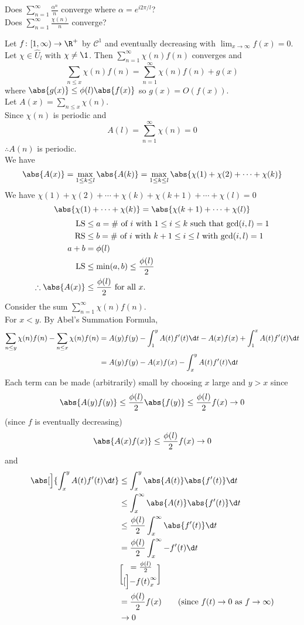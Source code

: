 \question Does $\sum_{n=1}^\infty\frac{\alpha^n}{n}$ converge where $\alpha=e^{i2\pi/l}$? \\
Does $\sum_{n=1}^\infty\frac{\chi(n)}{n}$ converge?

\thm Let $f\colon[1,\infty)\to\R^+$ by $\mathcal{C}^1$ and eventually decreasing with $\lim_{x\to\infty}f(x)=0$.  Let $\chi\in\hat U_l$ with $\chi\neq\1$.  Then $\sum_{n=1}^\infty\chi(n)f(n)$ converges and
\[ \sum_{n\leq x}\chi(n)f(n) = \sum_{n=1}^\infty \chi(n)f(n) + g(x) \]
where $\abs{g(x)}\leq\phi(l)\abs{f(x)}$ so $g(x)=O(f(x))$. \\
\pf Let $A(x)=\sum_{n\leq x}\chi(n)$. \\
Since $\chi(n)$ is periodic and
\[ A(l) = \sum_{n=1}^\infty \chi(n) = 0 \] 
$\therefore A(n)$ is periodic. \\
We have
\[ \abs{A(x)} = \max_{1\leq k\leq l}\abs{A(k)} = \max_{1\leq k\leq l}\abs{\chi(1)+\chi(2)+\dotsb+\chi(k)} \]
We have $\chi(1)+\chi(2)+\dotsb+\chi(k)+\chi(k+1)+\dotsb+\chi(l)=0$
\[ \abs{\chi(1)+\dotsb+\chi(k)} = \abs{\chi(k+1)+\dotsb+\chi(l)} \]
\begin{align*}
\text{LS} &\leq a = \text{\# of $i$ with $1\leq i\leq k$ such that $\gcd(i,l)=1$} \\
\text{RS} &\leq b = \text{\# of $i$ with $k+1\leq i\leq l$ with $\gcd(i,l)=1$} \\
a+b &= \phi(l) \\
\text{LS} &\leq \min(a,b) \leq \frac{\phi(l)}{2} \\
\therefore \abs{A(x)} &\leq \frac{\phi(l)}{2} \text{ for all $x$.}
\end{align*}
Consider the sum $\sum_{n=1}^\infty\chi(n)f(n)$. \\
For $x<y$.  By Abel's Summation Formula,
\begin{align*}
\sum_{n\leq y}\chi(n)f(n) - \sum_{n\leq x}\chi(n)f(n) &=
A(y)f(y) - \int_1^y A(t)f'(t)\d t - A(x)f(x) + \int_1^x A(t)f'(t)\d t \\
&= A(y)f(y) - A(x)f(x) - \int_x^y A(t) f'(t) \d t
\end{align*}
Each term can be made (arbitrarily) small by choosing $x$ large and $y>x$ since
\[ \abs{A(y)f(y)} \leq \frac{\phi(l)}{2} \abs{f(y)} \leq \frac{\phi(l)}{2} f(x) \to 0 \]
(since $f$ is eventually decreasing)
\[ \abs{A(x)f(x)} \leq \frac{\phi(l)}{2}f(x) \to 0 \]
and
\begin{align*}
\abs[\Big]{\int_x^y A(t) f'(t)\d t} &\leq \int_x^y\abs{A(t)}\abs{f'(t)}\d t \\
&\leq \int_x^\infty \abs{A(t)}\abs{f'(t)} \d t \\
&\leq \frac{\phi(l)}{2} \int_x^\infty \abs{f'(t)} \d t \\
&= \frac{\phi(l)}{2}\int_x^\infty-f'(t)\d t \\
&= \frac{\phi(l)}{2}\brack[\Big]{-f(t)}_x^{\infty} \\
&= \frac{\phi(l)}{2}f(x) \qquad\text{(since $f(t)\to0$ as $f\to\infty$)} \\
&\to 0
\end{align*}
